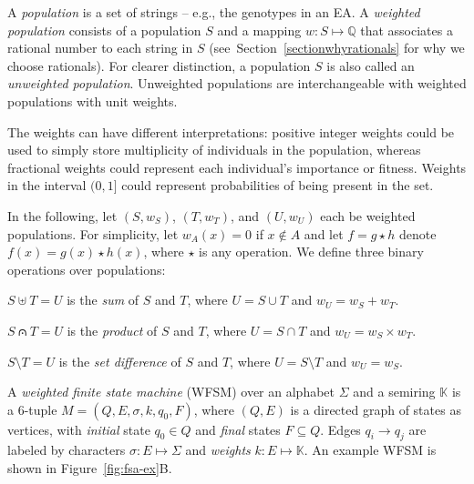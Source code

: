 \documentclass{llncs}
\begin{document}
A \emph{population} is a set of strings -- e.g., the genotypes in an EA.
A \emph{weighted population} consists of a population $S$ and a mapping $w : S \mapsto \mathbb{Q}$ that associates a rational number to each string in $S$ (see~Section~\ref{sectionwhyrationals} for why we choose rationals).
For clearer distinction, a population $S$ is also called an \emph{unweighted population}.
Unweighted populations are interchangeable with weighted populations with unit weights.

The weights can have different interpretations:
positive integer weights could be used to simply store multiplicity of individuals in the population,
whereas fractional weights could represent each individual's importance or fitness.
Weights in the interval $(0,1]$ could represent probabilities of being present in the set.%

In the following, let $(S, w_S)$, $(T, w_T)$, and $(U, w_U)$ each be weighted populations.
For simplicity, let $w_A(x)=0$ if $x \notin A$ and let $f = g \star h$ denote $f(x) = g(x) \star h(x)$, where $\star$ is any operation.
We define three binary operations over populations:

$S \uplus T = U$ is the \emph{sum} of $S$ and $T$, where $U = S \cup T$ and $w_U = w_S + w_T$.

$S \capdot T = U$ is the \emph{product} of $S$ and $T$, where $U = S \cap T$ and $w_U = w_S \times w_T$.

$S \setminus T = U$ is the \emph{set difference} of $S$ and $T$, where $U = S \setminus T$ and $w_U = w_S$.




A \emph{weighted finite state machine} (WFSM) over an alphabet $\Sigma$ and a semiring $\mathbb{K}$ is a 6-tuple $M = (Q, E, \sigma, k, q_0, F)$,
where $(Q,E)$ is a directed graph of states as vertices,
with \emph{initial} state $q_0 \in Q$ and \emph{final} states $F \subseteq Q$.
Edges $q_i \to q_j$ are labeled by characters $\sigma : E \mapsto \Sigma$ and \emph{weights} $k : E \mapsto \mathbb{K}$.
An example WFSM is shown in Figure~\ref{fig:fsa-ex}B.
\end{document}
